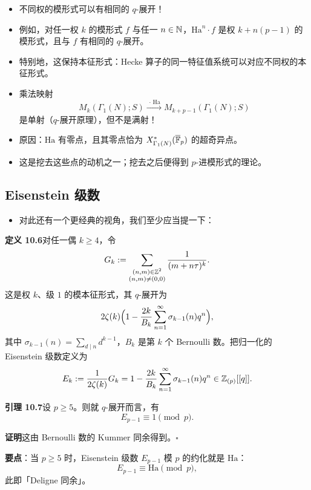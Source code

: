 \begin{itemize}
\item 不同权的模形式可以有相同的 $q$-展开！
\item 例如，对任一权 $k$ 的模形式 $f$ 与任一 $n\in\mathbb{N}$，$\mathrm{Ha}^n\cdot f$ 是权 $k+n(p-1)$ 的模形式，且与 $f$ 有相同的 $q$-展开。
\item 特别地，这保持本征形式：Hecke 算子的同一特征值系统可以对应不同权的本征形式。
\item 乘法映射
\[
M_k(\Gamma_1(N);S)\xrightarrow{\ \cdot\,\mathrm{Ha}\ }M_{k+p-1}(\Gamma_1(N);S)
\]
是单射（$q$-展开原理），但不是满射！
\item 原因：$\mathrm{Ha}$ 有零点，且其零点恰为 $X^{*}_{\Gamma_1(N)}(\overline{\mathbb{F}}_p)$ 的超奇异点。
\item 这是挖去这些点的动机之一；挖去之后便得到 $p$-进模形式的理论。
\end{itemize}

\subsection*{Eisenstein 级数}

\begin{itemize}
\item 对此还有一个更经典的视角，我们至少应当提一下：
\end{itemize}

\noindent\textbf{定义 10.6}\label{def:10.6}\quad 对任一偶 $k\ge 4$，令
\[
G_k:=\sum_{\substack{(n,m)\in\mathbb{Z}^2\\(n,m)\neq(0,0)}}\frac{1}{(m+n\tau)^k}.
\]
这是权 $k$、级 $1$ 的模本征形式，其 $q$-展开为
\[
2\zeta(k)\Bigl(1-\frac{2k}{B_k}\sum_{n=1}^{\infty}\sigma_{k-1}(n)q^n\Bigr),
\]
其中 $\sigma_{k-1}(n)=\sum_{d\mid n}d^{k-1}$，$B_k$ 是第 $k$ 个 Bernoulli 数。把归一化的 Eisenstein 级数定义为
\[
E_k:=\frac{1}{2\zeta(k)}G_k=1-\frac{2k}{B_k}\sum_{n=1}^{\infty}\sigma_{k-1}(n)q^n\in\mathbb{Z}_{(p)}[[q]].
\]

\noindent\textbf{引理 10.7}\label{lem:10.7}\quad 设 $p\ge 5$。则就 $q$-展开而言，有
\[
E_{p-1}\equiv 1\pmod p.
\]

\noindent\textbf{证明}\quad 这由 Bernoulli 数的 Kummer 同余得到。\hfill$\square$

\noindent\textbf{要点}：当 $p\ge 5$ 时，Eisenstein 级数 $E_{p-1}$ 模 $p$ 的约化就是 $\mathrm{Ha}$：
\[
E_{p-1}\equiv\mathrm{Ha}\pmod p,
\]
此即「Deligne 同余」。

